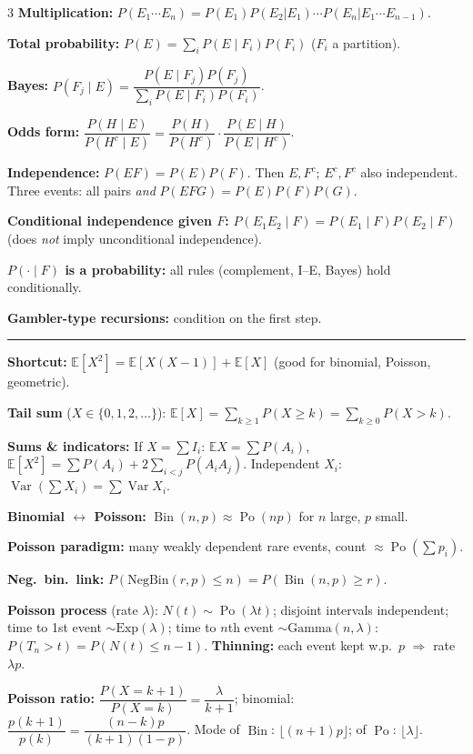 \documentclass[9pt]{extarticle}
\newcommand{\sect}[1]{\par\vspace{3pt}{\color{NavyBlue}\large\bfseries #1}\par\vspace{1pt}\hrule\vspace{2pt}}
\newcommand{\E}{\mathbb{E}}
\newcommand{\Var}{\operatorname{Var}}
\newcommand{\Po}{\operatorname{Po}}
\newcommand{\Bin}{\operatorname{Bin}}
\begin{document}
\begin{multicols}{3}
\textbf{Multiplication:} $P(E_1\cdots E_n)=P(E_1)P(E_2|E_1)\cdots P(E_n|E_1\cdots E_{n-1})$.

\textbf{Total probability:} $P(E)=\sum_i P(E\mid F_i)P(F_i)$ ($F_i$ a partition).

\textbf{Bayes:} $P(F_j\mid E)=\dfrac{P(E\mid F_j)P(F_j)}{\sum_iP(E\mid F_i)P(F_i)}$.

\textbf{Odds form:} $\dfrac{P(H\mid E)}{P(H^c\mid E)}=\dfrac{P(H)}{P(H^c)}\cdot\dfrac{P(E\mid H)}{P(E\mid H^c)}$.

\textbf{Independence:} $P(EF)=P(E)P(F)$. Then $E,F^c$; $E^c,F^c$ also independent.
Three events: all pairs \emph{and} $P(EFG)=P(E)P(F)P(G)$.

\textbf{Conditional independence given $F$:} $P(E_1E_2\mid F)=P(E_1\mid F)P(E_2\mid F)$
(does \emph{not} imply unconditional independence).

\textbf{$P(\cdot\mid F)$ is a probability:} all rules (complement, I--E, Bayes) hold conditionally.

\textbf{Gambler-type recursions:} condition on the first step.

\sect{4. Discrete random variables}


\textbf{Shortcut:} $\E[X^2]=\E[X(X-1)]+\E[X]$ (good for binomial, Poisson, geometric).

\textbf{Tail sum} ($X\in\{0,1,2,\dots\}$): $\E[X]=\sum_{k\ge1}P(X\ge k)=\sum_{k\ge0}P(X>k)$.

\textbf{Sums \& indicators:}  If $X=\sum I_i$:
$\E X=\sum P(A_i)$,\;
$\E[X^2]=\sum P(A_i)+2\sum_{i<j}P(A_iA_j)$.\;
Independent $X_i$: $\Var(\sum X_i)=\sum\Var X_i$.

\textbf{Binomial $\leftrightarrow$ Poisson:} $\Bin(n,p)\approx\Po(np)$ for $n$ large, $p$ small.

\textbf{Poisson paradigm:} many weakly dependent rare events, count $\approx\Po(\sum p_i)$.

\textbf{Neg.\ bin.\ link:} $P(\text{NegBin}(r,p)\le n)=P(\Bin(n,p)\ge r)$.

\textbf{Poisson process} (rate $\lambda$): $N(t)\sim\Po(\lambda t)$; disjoint intervals independent;
time to 1st event $\sim\text{Exp}(\lambda)$; time to $n$th event $\sim\text{Gamma}(n,\lambda)$:
$P(T_n>t)=P(N(t)\le n-1)$.\;
\textbf{Thinning:} each event kept w.p.\ $p$ $\Rightarrow$ rate $\lambda p$.

\textbf{Poisson ratio:} $\dfrac{P(X=k+1)}{P(X=k)}=\dfrac{\lambda}{k+1}$; \;
binomial: $\dfrac{p(k+1)}{p(k)}=\dfrac{(n-k)p}{(k+1)(1-p)}$.\;
Mode of $\Bin$: $\lfloor (n+1)p\rfloor$; of $\Po$: $\lfloor\lambda\rfloor$.


\end{multicols}
\end{document}
